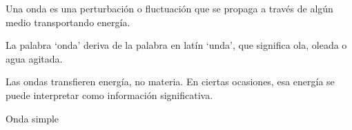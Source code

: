Una onda es una perturbación o fluctuación que se propaga a través de algún medio transportando energía.

La palabra `onda' deriva de la palabra en latín `unda', que significa ola, oleada o agua agitada.

Las ondas transfieren energía, no materia. En ciertas ocasiones, esa energía se puede interpretar como información significativa.

\begin{grafica}
\centering
{}
\caption{Onda simple}
\end{grafica}
